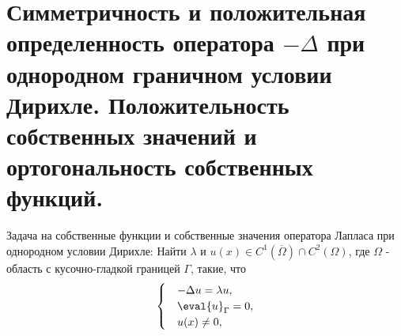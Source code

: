 \section{Симметричность и положительная определенность оператора $-\Delta$ при однородном граничном условии Дирихле. Положительность собственных значений и ортогональность собственных функций.}
Задача на собственные функции и собственные значения оператора Лапласа при однородном условии Дирихле:
Найти $\lambda$ и $u(x) \in C^1(\overline{\Omega}) \cap C^2(\Omega)$, где $\Omega$ - область с кусочно-гладкой границей $\Gamma$, такие, что
\[
\begin{cases}
&- \Delta u= \lambda u,\\
& \eval{u}_\Gamma=0,\\
& u(x) \neq 0,
\end{cases} 
\]

